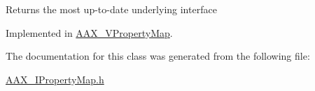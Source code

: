 Returns the most up-\/to-\/date underlying interface 

Implemented in \mbox{\hyperlink{a01937_acace1dda9b028f46bf0bfb4cc1400d14}{A\+A\+X\+\_\+\+V\+Property\+Map}}.



The documentation for this class was generated from the following file\+:\begin{DoxyCompactItemize}
\item 
\mbox{\hyperlink{a00632}{A\+A\+X\+\_\+\+I\+Property\+Map.\+h}}\end{DoxyCompactItemize}
